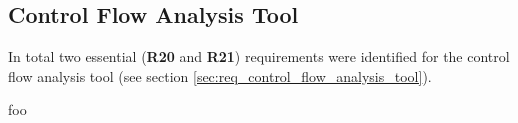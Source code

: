 
\subsection{Control Flow Analysis Tool}

In total two essential (\textbf{R20} and \textbf{R21}) requirements were identified for the control flow analysis tool (see section \ref{sec:req_control_flow_analysis_tool}).

foo
